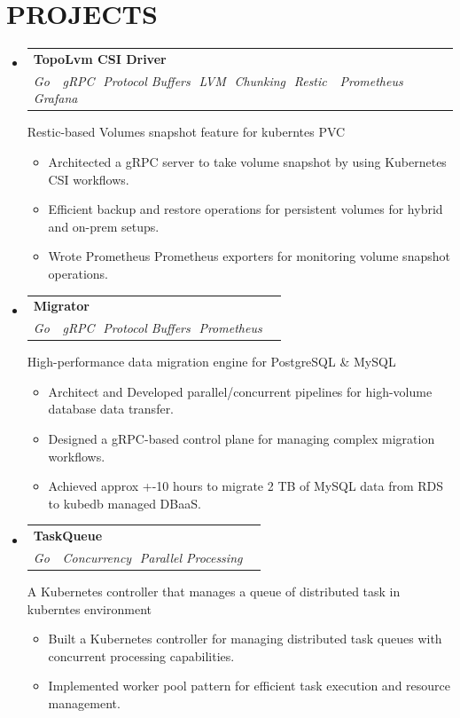 \documentclass[letterpaper,11pt]{article}
\makeatletter
\newcommand{\resumeItem}[1]{
  \item\small{
    {#1 \vspace{-1pt}}
  }
}
\newcommand{\resumeSubheading}[4]{
  \vspace{-2pt}\item
    \begin{tabular*}{1.0\textwidth}[t]{l@{\extracolsep{\fill}}r}
      \textbf{\large#1} & \textbf{\small #2} \\
      \textit{\large#3} & \textit{\small #4} \\
    \end{tabular*}\vspace{-7pt}
}
\newcommand{\resumeSubHeadingListStart}{\begin{itemize}[leftmargin=0.0in, label={}]}
\newcommand{\resumeSubHeadingListEnd}{\end{itemize}}
\newcommand{\resumeItemListStart}{\begin{itemize}[leftmargin=0.1in]}
\newcommand{\resumeItemListEnd}{\end{itemize}\vspace{-5pt}}
\makeatother
\begin{document}
\section{\color{airforceblue}PROJECTS}
  \resumeSubHeadingListStart
    \resumeSubheading
       {TopoLvm CSI Driver \href{https://github.com/cloudnativestorage/topolvm}{\faGithub}}{}
       {\small Go \,\textbullet\, \small gRPC \,\textbullet\,\small Protocol Buffers \,\textbullet\,\small LVM \,\textbullet\,\small Chunking \,\textbullet\,\small Restic \,\textbullet\, \small Prometheus \,\textbullet\,\small Grafana}{}      

       {Restic-based Volumes snapshot feature for kuberntes PVC}{}
      \resumeItemListStart
          \resumeItem{\normalsize{Architected a gRPC server to take volume snapshot by using Kubernetes CSI workflows.}}
          \resumeItem{\normalsize{Efficient backup and restore operations for persistent volumes for hybrid and on-prem setups.}}
          \resumeItem{\normalsize{Wrote Prometheus Prometheus exporters for monitoring volume snapshot operations.}}
      \resumeItemListEnd  

    \resumeSubheading
       {Migrator}{}
       {\small Go \,\textbullet\, \small gRPC \,\textbullet\,\small Protocol Buffers \,\textbullet\,\small Prometheus}{}      

       {High-performance data migration engine for PostgreSQL \& MySQL}{}
      \resumeItemListStart
          \resumeItem{\normalsize{Architect and Developed parallel/concurrent pipelines for high-volume database data transfer.}}
          \resumeItem{\normalsize{Designed a gRPC-based control plane for managing complex migration workflows.}}
          \resumeItem{\normalsize{Achieved approx +-10 hours to migrate 2 TB of MySQL data from RDS to kubedb managed DBaaS.}}
      \resumeItemListEnd  

    \resumeSubheading
       {TaskQueue \href{https://github.com/kubeops/taskqueue}{\faGithub}}{}
       {\small Go \,\textbullet\, \small Concurrency \,\textbullet\,\small Parallel Processing}{}    
       
       {A Kubernetes controller that manages a queue of distributed task in kuberntes environment}{}
      \resumeItemListStart
          \resumeItem{\normalsize{Built a Kubernetes controller for managing distributed task queues with concurrent processing capabilities.}}
          \resumeItem{\normalsize{Implemented worker pool pattern for efficient task execution and resource management.}}
      \resumeItemListEnd
  \resumeSubHeadingListEnd
\vspace{-12pt}
\end{document}
